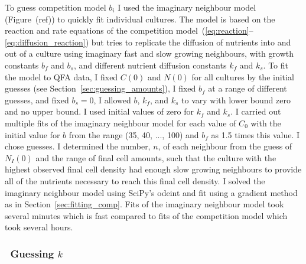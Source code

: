 To guess competition model \(b_{i}\) I used the imaginary neighbour
model (Figure~(ref)) to quickly fit individual cultures. The model is
based on the reaction and rate equations of the competition
model~(\ref{eq:reaction}--\ref{eq:diffusion_reaction}) but tries to
replicate the diffusion of nutrients into and out of a culture using
imaginary fast and slow growing neighbours, with growth constants
\(b_{f}\) and \(b_{s}\), and different nutrient diffusion constants
\(k_{f}\) and \(k_{s}\). To fit the model to QFA data, I fixed
\(C(0)\) and \(N(0)\) for all cultures by the initial guesses (see
Section~\ref{sec:guessing_amounts}), I fixed \(b_{f}\) at a range of
different guesses, and fixed \(b_{s} = 0\), I allowed \(b\),
\(k_{f}\), and \(k_{s}\) to vary with lower bound zero and no upper
bound. I used initial values of zero for \(k_{f}\) and \(k_{s}\). I
carried out multiple fits of the imaginary neighbour model for each
value of \(C_{0}\) with the initial value for \(b\) from the range
(35, 40, ..., 100) and \(b_{f}\) as 1.5 times this value. I chose
guesses. I determined the number, \(n\), of each neighbour from the
guess of \(N_{I}(0)\) and the range of final cell amounts, such that
the culture with the highest observed final cell density had enough
slow growing neighbours to provide all of the nutrients necessary to
reach this final cell density. I solved the imaginary neighbour model
using SciPy's odeint and fit using a gradient method as in
Section~\ref{sec:fitting_comp}. Fits of the imaginary neighbour model
took several minutes which is fast compared to fits of the competition
model which took several hours.


\subsubsection{\boldmath \thesubsubsection~Guessing \({k}\) \unboldmath}

